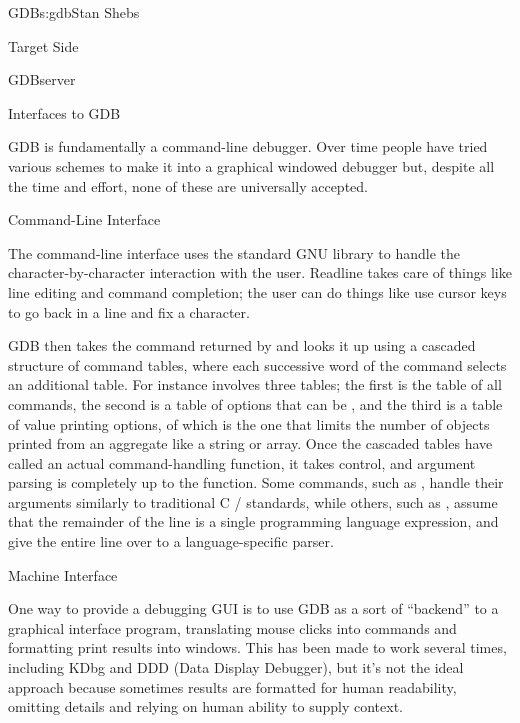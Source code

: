 \begin{aosachapter}{GDB}{s:gdb}{Stan Shebs}
\begin{aosasect1}{Target Side}
\begin{aosasect2}{GDBserver}
\end{aosasect2}

\end{aosasect1}

\begin{aosasect1}{Interfaces to GDB}

GDB is fundamentally a command-line debugger.  Over time people have
tried various schemes to make it into a graphical windowed debugger
but, despite all the time and effort, none of these are universally
accepted.

\begin{aosasect2}{Command-Line Interface}

The command-line interface uses the standard GNU library
 to handle the character-by-character interaction with
the user.  Readline takes care of things like line editing and command
completion; the user can do things like use cursor keys to go back in
a line and fix a character.

GDB then takes the command returned by  and looks it up
using a cascaded structure of command tables, where each successive
word of the command selects an additional table.  For instance
 involves three tables; the first is the
table of all commands, the second is a table of options that can be
, and the third is a table of value printing options, of
which  is the one that limits the number of objects
printed from an aggregate like a string or array.  Once the cascaded
tables have called an actual command-handling function, it takes
control, and argument parsing is completely up to the function.  Some
commands, such as , handle their arguments similarly to
traditional C / standards, while others, such as
, assume that the remainder of the line is a single
programming language expression, and give the entire line over to a
language-specific parser.

\end{aosasect2}

\begin{aosasect2}{Machine Interface}

One way to provide a debugging GUI is to use GDB as a sort of
``backend'' to a graphical interface program, translating mouse clicks
into commands and formatting print results into windows.  This has
been made to work several times, including KDbg and DDD (Data Display Debugger), but it's not the
ideal approach because sometimes results are formatted for human
readability, omitting details and relying on human ability to supply
context.


\end{aosasect2}
\end{aosasect1}
\end{aosachapter}
